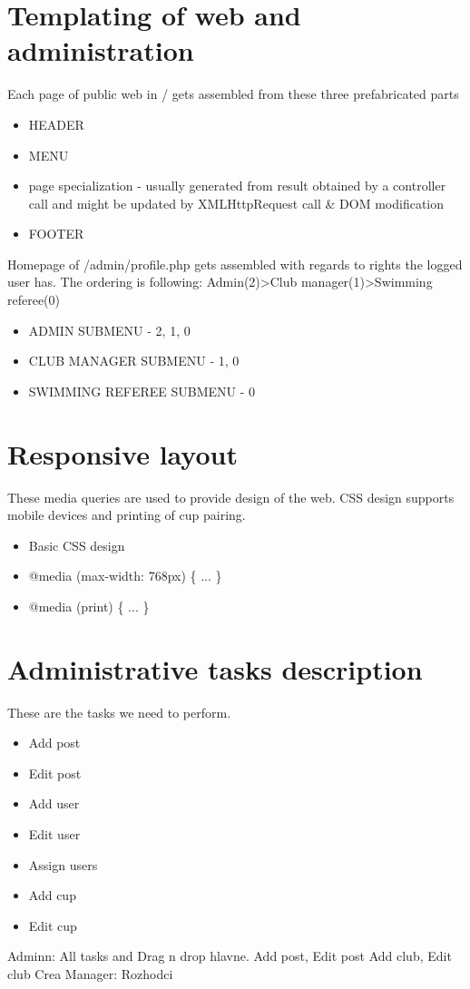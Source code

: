 \section{Templating of web and administration}
Each page of public web in / gets assembled from these three prefabricated parts
\begin{itemize}
    \item HEADER
    \item MENU
    \item page specialization - usually generated from result obtained by a controller call and might be updated by XMLHttpRequest call \& DOM modification
    \item FOOTER
\end{itemize}
Homepage of /admin/profile.php gets assembled with regards to rights the logged user has. The ordering is following: Admin(2)\textgreater Club manager(1)\textgreater Swimming referee(0)
\begin{itemize}
    \item ADMIN SUBMENU - 2, 1, 0
    \item CLUB MANAGER SUBMENU - 1, 0
    \item SWIMMING REFEREE SUBMENU - 0
\end{itemize}
\section{Responsive layout}
These media queries are used to provide design of the web. CSS design supports mobile devices and printing of cup pairing.
\begin{itemize}
    \item Basic CSS design
    \item @media (max-width: 768px) \{ ... \}
    \item @media (print) \{ ... \}
\end{itemize}
\section{Administrative tasks description}
These are the tasks we need to perform.
\begin{itemize}
    \item Add post
    \item Edit post
    \item Add user
    \item Edit user
    \item Assign users
    \item Add cup
    \item Edit cup
\end{itemize}    
Adminn:
All tasks and Drag n drop hlavne.
Add post, Edit post
Add club, Edit club
Crea
Manager:
Rozhodci
